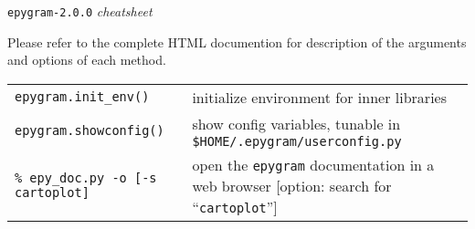 \documentclass[a4paper,10pt]{article}
\date{\vspace{-1.5cm}}
\begin{document}
\huge
\begin{center}
\texttt{epygram-2.0.0} \textit{cheatsheet}
\end{center}
\normalsize

Please refer to the complete HTML documention for description of the arguments and options of each method.\\

\begin{tabular}{|p{9.5cm}|p{9.5cm}|}
\rowcolor{gray!50}
\multicolumn{2}{|c|}{\textbf{Miscellaneous}}\\
\hline
\texttt{epygram.init\_env()} & initialize environment for inner libraries\\
\texttt{epygram.showconfig()} & show config variables, tunable in \texttt{\$HOME/.epygram/userconfig.py}\\
\texttt{\% epy\_doc.py -o [-s cartoplot]} & open the \texttt{epygram} documentation in a web browser [option: search for ``\texttt{cartoplot}'']\\
\hline
\end{tabular}\\
\\

\end{document}
